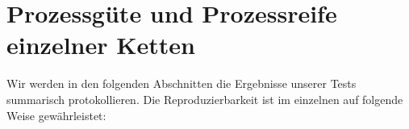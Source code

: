 %
%
%

\section{Prozessgüte und Prozessreife einzelner Ketten}

Wir werden in den folgenden Abschnitten die Ergebnisse unserer Tests summarisch
protokollieren. Die Reproduzierbarkeit ist im einzelnen auf folgende Weise
gewährleistet:

